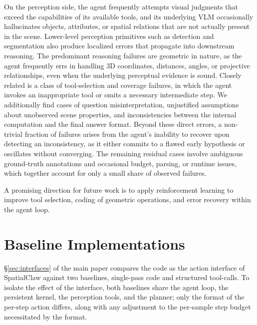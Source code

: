 \documentclass{llmxive}
\providecommand{\ours}{SpatialClaw}
\begin{document}
On the perception side, the agent frequently attempts visual judgments that exceed the capabilities of its available tools, and its underlying VLM occasionally hallucinates objects, attributes, or spatial relations that are not actually present in the scene. Lower-level perception primitives such as detection and segmentation also produce localized errors that propagate into downstream reasoning. 
The predominant reasoning failures are geometric in nature, as the agent frequently errs in handling 3D coordinates, distances, angles, or projective relationships, even when the underlying perceptual evidence is sound. 
Closely related is a class of tool-selection and coverage failures, in which the agent invokes an inappropriate tool or omits a necessary intermediate step.
We additionally find cases of question misinterpretation, unjustified assumptions about unobserved scene properties, and inconsistencies between the internal computation and the final answer format. 
Beyond these direct errors, a non-trivial fraction of failures arises from the agent's inability to recover upon detecting an inconsistency, as it either commits to a flawed early hypothesis or oscillates without converging. 
The remaining residual cases involve ambiguous ground-truth annotations and occasional budget, parsing, or runtime issues, which together account for only a small share of observed failures. 

A promising direction for future work is to apply reinforcement learning to improve tool selection, coding of geometric operations, and error recovery within the agent loop.

\section{Baseline Implementations}
\label{app:baselines}

\S\ref{sec:interfaces} of the main paper compares the code as the action interface of \ours{} against two baselines, single-pass code and structured tool-calls. To isolate the effect of the interface, both baselines share the agent loop, the persistent kernel, the perception tools, and the planner; only the format of the per-step action differs, along with any adjustment to the per-sample step budget necessitated by the format.
\end{document}
